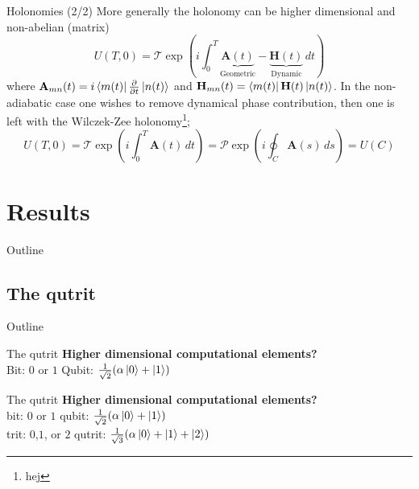 \documentclass[t]{beamer}
\begin{document}
\begin{frame}{Holonomies (2/2)}
More generally the holonomy can be higher dimensional and non-abelian (matrix)
\begin{equation}
U(T,0) = \mathcal{T}\exp\left(i\int_{0}^{T} \underbrace{\mathbf{A}(t)}_{\text{Geometric}} - \underbrace{\mathbf{H}(t)}_{\text{Dynamic}}\,dt\right)
\end{equation}
where $\mathbf{A}_{mn}(t) = i\bra{m(t)}\pdv{}{t}\ket{n(t)}$ and
$\mathbf{H}_{mn}(t) = \bra{m(t)}\mathbf{H}(t)\ket{n(t)}$.
In the non-adiabatic case one wishes to remove dynamical phase contribution, then one is left with the Wilczek-Zee holonomy\footnote{hej };
\begin{equation}
U(T,0) = \mathcal{T}\exp\left(i\int_{0}^{T}\mathbf{A}(t)\,dt\right) = \mathcal{P}\exp\left(i\oint_{C}\mathbf{A}(s)\,ds\right) = U(C)
\end{equation}



\end{frame}


\section{Results}

\begin{frame}{Outline}
\tableofcontents[ 
currentsubsection, 
hideothersubsections, 
sectionstyle=show/shaded, 
subsectionstyle=show/shaded, 
] 
\end{frame}

\subsection{The qutrit}
\begin{frame}{Outline}
\tableofcontents[ 
currentsubsection, 
hideothersubsections, 
sectionstyle=show/shaded, 
subsectionstyle=show/shaded, 
] 
\end{frame}
\begin{frame}{The qutrit}
\textbf{Higher dimensional computational elements?}
\\
Bit: $0$ or $1$ \hspace{1cm} Qubit: $\frac{1}{\sqrt{2}}(\alpha\ket{0} + \ket{1})$



\end{frame}

\begin{frame}{The qutrit}
\textbf{Higher dimensional computational elements?}
\\
bit: $0$ or $1$ \hspace{4cm} qubit: $\frac{1}{\sqrt{2}}(\alpha\ket{0} + \ket{1})$
\\
trit: $0$,$1$, or $2$ \hspace{3.5cm} qutrit: $\frac{1}{\sqrt{3}}(\alpha\ket{0} + \ket{1} + \ket{2})$


\end{frame}
\end{document}
